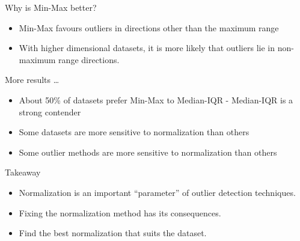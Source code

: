 \documentclass{beamer}
\newcommand{\dist}{\text{dist}}
\begin{document}
\begin{darkframes}
\begin{frame}{Why is Min-Max better?}
    \begin{itemize}
        \item Min-Max favours outliers in directions other than the maximum range
        \item With higher dimensional datasets, it is more likely that outliers lie in  non-maximum range directions.
    \end{itemize}
	
    
    \end{frame}
 		
 	\begin{frame}{More results \ldots}
 	\begin{itemize}
 	    \item About 50\% of datasets prefer  Min-Max to Median-IQR - Median-IQR is a strong contender \\ \vspace{0.5cm}
 	    \item Some datasets are more sensitive to normalization than others  \\ \vspace{0.5cm}
 	    \item Some outlier methods are more sensitive to normalization than others
 	    
 	\end{itemize}
 	    
 	\end{frame}	
 	\begin{frame}{Takeaway}
 	    \begin{itemize}
 			\item 	Normalization is an important ``parameter'' of outlier detection techniques.
 			\vspace{0.5cm}
 			\item  Fixing the normalization method has its consequences.
 			\vspace{0.5cm}
 			\item  Find the best normalization that suits the dataset.
 		\end{itemize}
 		 
 	\end{frame}
 		

\end{darkframes}
\end{document}
